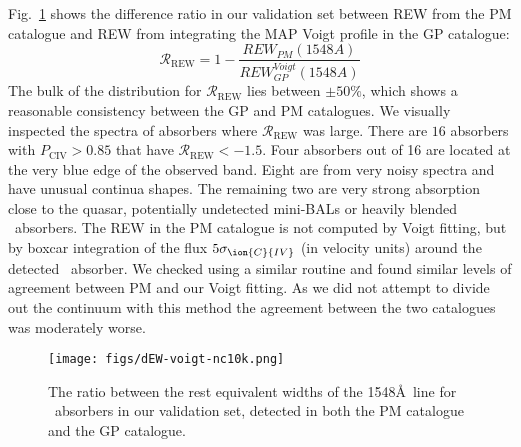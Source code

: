 \documentclass[fleqn,usenatbib]{mnras}
\newcommand{\civ}{\ion{C}{IV}}
\newcommand{\sciv}{\sigma_{\civ}}
\newcommand{\kms}{kms$^{-1}$} %
\newcommand{\spb}[1]{\textcolor{red}{[\bf SPB: #1]}}
\newcommand{\rmon}[1]{\textcolor{rez}{[\bf RM: #1]}}
\begin{document}
Fig.~\ref{fig:Dewdr7} shows the difference ratio in our validation set between REW from the PM catalogue and REW from integrating the MAP Voigt profile in the GP catalogue:
\begin{equation}
\mathcal{R}_\mathrm{REW} = 1-\frac{REW_{PM}(1548A)}{REW_{GP}^{Voigt}(1548A)}
 \end{equation}
The bulk of the distribution for $\mathcal{R}_\mathrm{REW}$ lies between
    $\pm50\%$, which shows a reasonable consistency between the GP and PM catalogues.
    We visually inspected the spectra of absorbers where $\mathcal{R}_\mathrm{REW}$ was large.
    There are $16$ absorbers with $P_\mathrm{CIV} > 0.85$ that have $\mathcal{R}_\mathrm{REW} < -1.5$. Four absorbers out of 16 are located at the very blue edge of the observed band. Eight are from very noisy spectra and have unusual continua shapes. The remaining two are very strong absorption close to the quasar, potentially undetected mini-BALs or heavily blended \civ\ absorbers.
    The REW in the PM catalogue is not computed by Voigt fitting, but by boxcar integration of the flux
     $5\sciv$ (in velocity units) around the detected \civ\ absorber. We checked using a similar routine and found similar levels of agreement between PM and our Voigt fitting. As we did not attempt to divide out the continuum with this method the agreement between the two catalogues was moderately worse.



    \begin{figure}
      \texttt{[image: figs/dEW-voigt-nc10k.png]}
      \caption{The ratio between the rest
      equivalent widths of the 1548\AA~line for \civ~absorbers in our validation set, detected in both the PM catalogue and the GP catalogue. %
      }
      \label{fig:Dewdr7}
    \end{figure}
\end{document}
